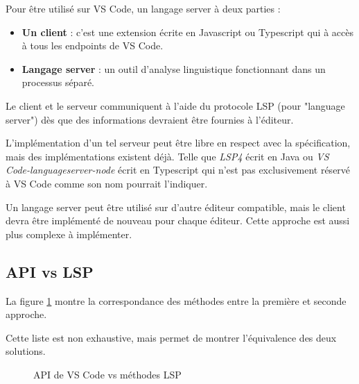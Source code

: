 \documentclass[
    iict, %
    il, %
]{heig-tb}
\begin{document}
Pour être utilisé sur VS Code, un langage server à deux parties :
\begin{itemize}
    \item \textbf{Un client} : c'est une extension écrite en Javascript ou Typescript qui à accès à tous les endpoints de VS Code.
    \item \textbf{Langage server} : un outil d'analyse linguistique fonctionnant dans un processus séparé.
\end{itemize}

\vspace{\parskip}

Le client et le serveur communiquent à l'aide du protocole LSP (pour "language server") dès que des informations devraient être fournies à l'éditeur.

L'implémentation d'un tel serveur peut être libre en respect avec la spécification, mais des implémentations existent déjà. Telle que \emph{LSP4} écrit en Java ou \emph{VS Code-languageserver-node}
écrit en Typescript qui n'est pas exclusivement réservé à VS Code comme son nom pourrait l'indiquer.

Un langage server peut être utilisé sur d'autre éditeur compatible, mais le client devra être implémenté de nouveau pour chaque éditeur.
Cette approche est aussi plus complexe à implémenter.

\subsection{API vs LSP}\label{api vs lsp}

La figure \ref{API de VS Code vs méthodes LSP} montre la correspondance des méthodes entre la première et seconde approche.

Cette liste est non exhaustive, mais permet de montrer l'équivalence des deux solutions.

\begin{figure}[!ht]
    \begin{center}
    \end{center}
    \caption[API de VS Code vs méthodes LSP]{\label{API de VS Code vs méthodes LSP} API de VS Code vs méthodes LSP}
\end{figure}
\end{document}
